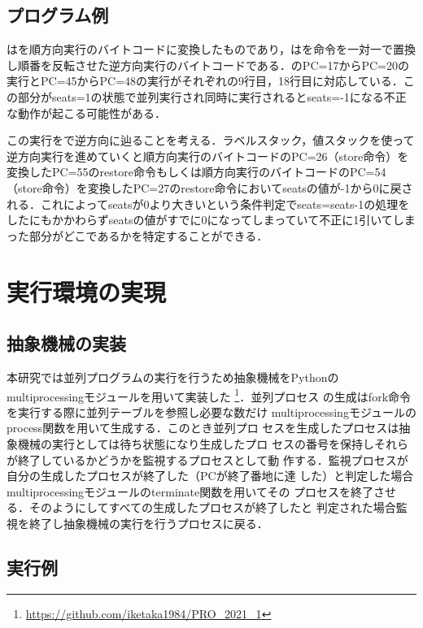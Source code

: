 \documentclass[submit,PRO]{ipsj}
\begin{document}
\subsection{プログラム例}

はを順方向実行のバイトコードに変換したものであり，はを命令を一対一で置換し順番を反転させた逆方向実行のバイトコードである．のPC=17からPC=20の実行とPC=45からPC=48の実行がそれぞれの9行目，18行目に対応している．この部分がseats=1の状態で並列実行され同時に実行されるとseats=-1になる不正な動作が起こる可能性がある．

この実行をで逆方向に辿ることを考える．ラベルスタック，値スタックを使って逆方向実行を進めていくと順方向実行のバイトコードのPC=26（store命令）を変換したPC=55のrestore命令もしくは順方向実行のバイトコードのPC=54（store命令）を変換したPC=27のrestore命令においてseatsの値が-1から0に戻される．これによってseatsが0より大きいという条件判定でseats=seats-1の処理をしたにもかかわらずseatsの値がすでに0になってしまっていて不正に1引いてしまった部分がどこであるかを特定することができる．

\section{実行環境の実現}

\subsection{抽象機械の実装}

本研究では並列プログラムの実行を行うため抽象機械をPythonの
multiprocessingモジュールを用いて実装した
\footnote{\url{https://github.com/iketaka1984/PRO_2021_1}}．並列プロセス
の生成はfork命令を実行する際に並列テーブルを参照し必要な数だけ
multiprocessingモジュールのprocess関数を用いて生成する．このとき並列プロ
セスを生成したプロセスは抽象機械の実行としては待ち状態になり生成したプロ
セスの番号を保持しそれらが終了しているかどうかを監視するプロセスとして動
作する．監視プロセスが自分の生成したプロセスが終了した（PCが終了番地に達
した）と判定した場合multiprocessingモジュールのterminate関数を用いてその
プロセスを終了させる．そのようにしてすべての生成したプロセスが終了したと
判定された場合監視を終了し抽象機械の実行を行うプロセスに戻る．

\subsection{実行例}
\end{document}
